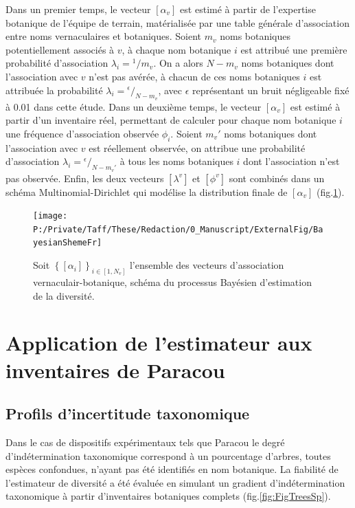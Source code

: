 \documentclass[
  11pt,
  french,
  A4paper,
  extrafontsizes,onecolumn,openright
  ]{memoir}
\begin{document}
Dans un premier temps, le vecteur \([\alpha_v]\) est estimé à partir de
l'expertise botanique de l'équipe de terrain, matérialisée par une table
générale d'association entre noms vernaculaires et botaniques. Soient
\(m_v\) noms botaniques potentiellement associés à \(v\), à chaque nom
botanique \(i\) est attribué une première probabilité d'association
\(\lambda_i={}^1/m_v\). On a alors \(N-m_v\) noms botaniques dont
l'association avec \(v\) n'est pas avérée, à chacun de ces noms
botaniques \(i\) est attribuée la probabilité
\(\lambda_i={}^\epsilon\big/_{N-m_v}\), avec \(\epsilon\) représentant
un bruit négligeable fixé à 0.01 dans cette étude. Dans un deuxième
temps, le vecteur \([\alpha_v]\) est estimé à partir d'un inventaire
réel, permettant de calculer pour chaque nom botanique \(i\) une
fréquence d'association observée \(\phi_i\). Soient \(m_v'\) noms
botaniques dont l'association avec \(v\) est réellement observée, on
attribue une probabilité d'association
\(\lambda_i={}^\epsilon\big/_{N-m_v'}\) à tous les noms botaniques \(i\)
dont l'association n'est pas observée. Enfin, les deux vecteurs
\([\lambda^v]\) et \([\phi^v]\) sont combinés dans un schéma
Multinomial-Dirichlet qui modélise la distribution finale de
\([\alpha_v]\) \autocite{McCarthy2007}
(fig.\ref{fig:FigBayesianScheme}).



\begin{figure}[h]

{\centering \texttt{[image: P:/Private/Taff/These/Redaction/0\_Manuscript/ExternalFig/BayesianShemeFr]} 

}

\caption{Soit \(\left\{[\alpha_i]\right\}_{i\in[1,N_v]}\) l'ensemble des vecteurs d'association vernaculair-botanique, schéma du processus Bayésien d'estimation de la diversité.}\label{fig:FigBayesianScheme}
\end{figure}

\section{Application de l'estimateur aux inventaires de
Paracou}\label{application-de-lestimateur-aux-inventaires-de-paracou}

\subsection{Profils d'incertitude
taxonomique}\label{profils-dincertitude-taxonomique}

Dans le cas de dispositifs expérimentaux tels que Paracou le degré
d'indétermination taxonomique correspond à un pourcentage d'arbres,
toutes espèces confondues, n'ayant pas été identifiés en nom botanique.
La fiabilité de l'estimateur de diversité a été évaluée en simulant un
gradient d'indétermination taxonomique à partir d'inventaires botaniques
complets (fig.\ref{fig:FigTreesSp}).
\end{document}
